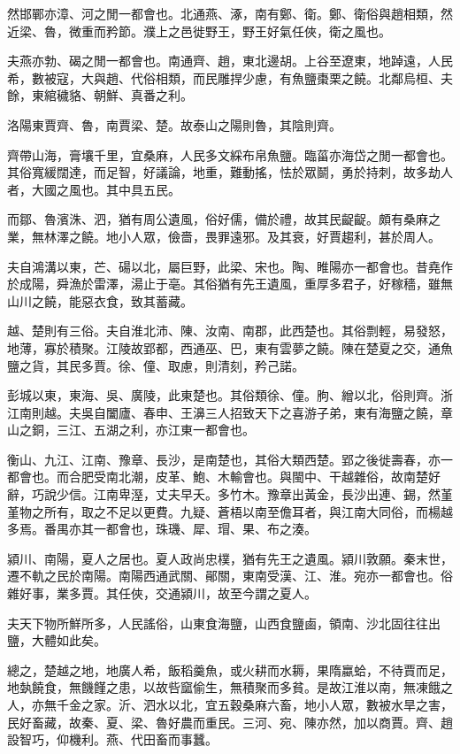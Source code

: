 然邯鄲亦漳、河之閒一都會也。北通燕、涿，南有鄭、衛。鄭、衛俗與趙相類，然近梁、魯，微重而矜節。濮上之邑徙野王，野王好氣任俠，衛之風也。

夫燕亦勃、碣之閒一都會也。南通齊、趙，東北邊胡。上谷至遼東，地踔遠，人民希，數被寇，大與趙、代俗相類，而民雕捍少慮，有魚鹽棗栗之饒。北鄰烏桓、夫餘，東綰穢貉、朝鮮、真番之利。

洛陽東賈齊、魯，南賈梁、楚。故泰山之陽則魯，其陰則齊。

齊帶山海，膏壤千里，宜桑麻，人民多文綵布帛魚鹽。臨菑亦海岱之閒一都會也。其俗寬緩闊達，而足智，好議論，地重，難動搖，怯於眾鬬，勇於持刺，故多劫人者，大國之風也。其中具五民。

而鄒、魯濱洙、泗，猶有周公遺風，俗好儒，備於禮，故其民齪齪。頗有桑麻之業，無林澤之饒。地小人眾，儉嗇，畏罪遠邪。及其衰，好賈趨利，甚於周人。

夫自鴻溝以東，芒、碭以北，屬巨野，此梁、宋也。陶、睢陽亦一都會也。昔堯作於成陽，舜漁於雷澤，湯止于亳。其俗猶有先王遺風，重厚多君子，好稼穡，雖無山川之饒，能惡衣食，致其蓄藏。

越、楚則有三俗。夫自淮北沛、陳、汝南、南郡，此西楚也。其俗剽輕，易發怒，地薄，寡於積聚。江陵故郢都，西通巫、巴，東有雲夢之饒。陳在楚夏之交，通魚鹽之貨，其民多賈。徐、僮、取慮，則清刻，矜己諾。

彭城以東，東海、吳、廣陵，此東楚也。其俗類徐、僮。朐、繒以北，俗則齊。浙江南則越。夫吳自闔廬、春申、王濞三人招致天下之喜游子弟，東有海鹽之饒，章山之銅，三江、五湖之利，亦江東一都會也。

衡山、九江、江南、豫章、長沙，是南楚也，其俗大類西楚。郢之後徙壽春，亦一都會也。而合肥受南北潮，皮革、鮑、木輸會也。與閩中、干越雜俗，故南楚好辭，巧說少信。江南卑溼，丈夫早夭。多竹木。豫章出黃金，長沙出連、錫，然堇堇物之所有，取之不足以更費。九疑、蒼梧以南至儋耳者，與江南大同俗，而楊越多焉。番禺亦其一都會也，珠璣、犀、瑁、果、布之湊。

潁川、南陽，夏人之居也。夏人政尚忠樸，猶有先王之遺風。潁川敦願。秦末世，遷不軌之民於南陽。南陽西通武關、鄖關，東南受漢、江、淮。宛亦一都會也。俗雜好事，業多賈。其任俠，交通潁川，故至今謂之夏人。

夫天下物所鮮所多，人民謠俗，山東食海鹽，山西食鹽鹵，領南、沙北固往往出鹽，大體如此矣。

總之，楚越之地，地廣人希，飯稻羹魚，或火耕而水耨，果隋蠃蛤，不待賈而足，地埶饒食，無饑饉之患，以故呰窳偷生，無積聚而多貧。是故江淮以南，無凍餓之人，亦無千金之家。沂、泗水以北，宜五穀桑麻六畜，地小人眾，數被水旱之害，民好畜藏，故秦、夏、梁、魯好農而重民。三河、宛、陳亦然，加以商賈。齊、趙設智巧，仰機利。燕、代田畜而事蠶。

